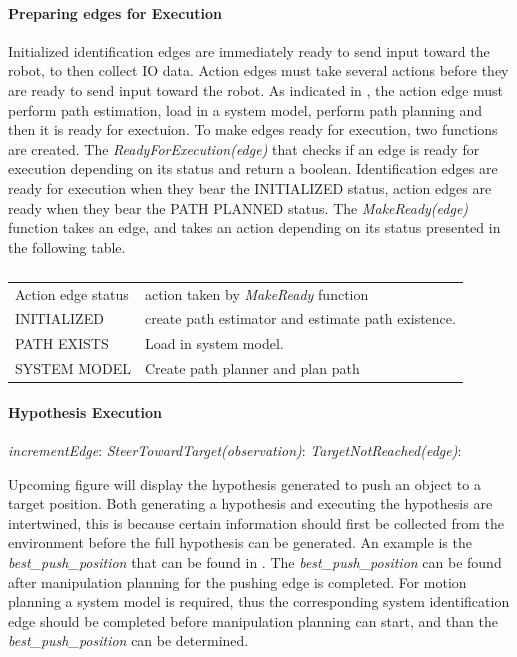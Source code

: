 \paragraph{Preparing edges for Execution}
Initialized identification edges are immediately ready to send input toward the robot, to then collect \ac{IO} data. Action edges must take several actions before they are ready to send input toward the robot. As indicated in , the action edge must perform path estimation, load in a system model, perform path planning and then it is ready for exectuion. To make edges ready for execution, two functions are created. The \textit{ReadyForExecution(\gls{edge})} that checks if an edge is ready for execution depending on its status and return a boolean. Identification edges are ready for execution when they bear the INITIALIZED status, action edges are ready when they bear the PATH PLANNED status. The \textit{MakeReady(\gls{edge})} function takes an edge, and takes an action depending on its status presented in the following table.\bs

\begin{table}[H]
    \centering
    \begin{tabular}%
    {>{\raggedright\arraybackslash}p{}%
    >{\raggedright\arraybackslash}p{}}
      Action edge status& action taken by \textit{MakeReady} function\\
      INITIALIZED& create path estimator and estimate path existence.\\
      PATH EXISTS& Load in system model.\\
      SYSTEM MODEL& Create path planner and plan path 
    \end{tabular}
    \caption{}%
    \label{table:make_action_edge_ready}
\end{table}


\paragraph{Hypothesis Execution}

\textit{incrementEdge}:
\textit{SteerTowardTarget(\gls{observation})}:
\textit{TargetNotReached(\gls{edge})}:



Upcoming figure will display the hypothesis generated to push an object to a target position. Both generating a hypothesis and executing the hypothesis are intertwined, this is because certain information should first be collected from the environment before the full hypothesis can be generated. An example is the \textit{best\_push\_position} that can be found in . The \textit{best\_push\_position} can be found after manipulation planning for the pushing edge is completed. For motion planning a system model is required, thus the corresponding system identification edge should be completed before manipulation planning can start, and than the \textit{best\_push\_position} can be determined.\bs

